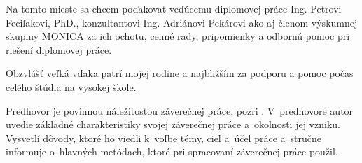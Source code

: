 \documentclass[]{tukediphc}
\begin{document}
\renewcommand\theHfigure{\theHsection.\arabic{figure}}
\renewcommand\theHtable{\theHsection.\arabic{table}}


\prvastrana

\titulnastrana

\abstraktsk %

\abstrakteng %

\kabstrakt %

% 
\zadanieprace

\cestnevyhlasenie

\podakovanie
Na tomto mieste sa chcem poďakovať vedúcemu diplomovej práce Ing. Petrovi 
Feciľakovi, PhD., konzultantovi Ing. Adriánovi Pekárovi ako aj členom 
výskumnej skupiny MONICA za ich ochotu, cenné
rady, pripomienky a odbornú pomoc pri riešení diplomovej práce.

Obzvlášť veľká vďaka patrí mojej rodine a najbližším za podporu a pomoc 
počas celého štúdia na vysokej škole.
\kpodakovania

\predhovor
Predhovor je povinnou náležitosťou záverečnej práce, pozri
\citep{gonda}. V~predhovore autor uvedie základné charakteristiky
svojej záverečnej práce a~okolnosti jej vzniku. Vysvetlí dôvody, ktoré
ho viedli k~voľbe témy, cieľ a~účel práce a~stručne informuje
o~hlavných metódach, ktoré pri spracovaní záverečnej práce použil.
\kpredhovoru

\thispagestyle{empty}
\tableofcontents
\newpage

\thispagestyle{empty}
\listoffigures
\newpage

\thispagestyle{empty}
\listoftables
\newpage

\thispagestyle{empty}
\printglossary %
\newpage

\slovnikterminov
\end{document}
